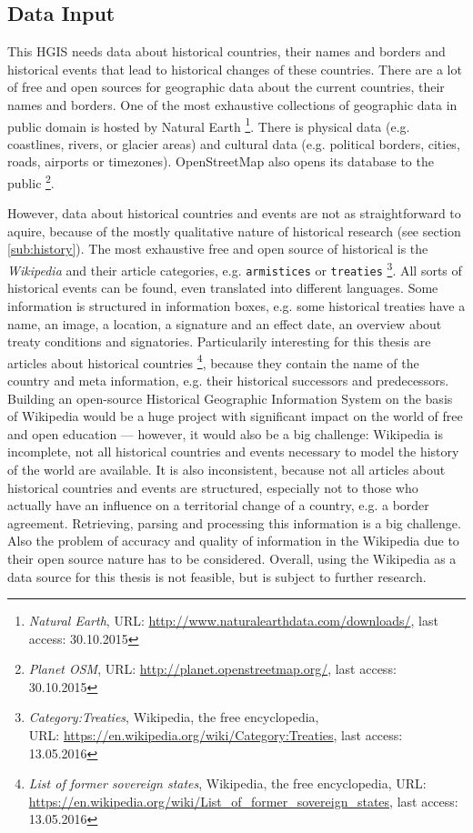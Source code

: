 \subsection{Data Input} %
\label{sub:input}

This HGIS needs data about historical countries, their names and borders and historical events that lead to historical changes of these countries. There are a lot of free and open sources for geographic data about the current countries, their names and borders. One of the most exhaustive collections of geographic data in public domain is hosted by Natural Earth
\footnote{
  \textit{Natural Earth},
  URL: \url{http://www.naturalearthdata.com/downloads/},
  last access: 30.10.2015
}.
There is physical data (e.g. coastlines, rivers, or glacier areas) and cultural data (e.g. political borders, cities, roads, airports or timezones). OpenStreetMap also opens its database to the public
\footnote{
  \textit{Planet OSM},
  URL: \url{http://planet.openstreetmap.org/},
  last access: 30.10.2015
}.

However, data about historical countries and events are not as straightforward to aquire, because of the mostly qualitative nature of historical research (see section \ref{sub:history}). The most exhaustive free and open source of historical is the \emph{Wikipedia} and their article categories, e.g. \texttt{armistices} or \texttt{treaties}
\footnote{
  \textit{Category:Treaties},
  Wikipedia, the free encyclopedia,\\
  URL: \url{https://en.wikipedia.org/wiki/Category:Treaties},
  last access: 13.05.2016
}.
All sorts of historical events can be found, even translated into different languages. Some information is structured in information boxes, e.g. some historical treaties have a name, an image, a location, a signature and an effect date, an overview about treaty conditions and signatories. Particularily interesting for this thesis are articles about historical countries
\footnote{
  \textit{List of former sovereign states},
  Wikipedia, the free encyclopedia,
  URL: \url{https://en.wikipedia.org/wiki/List_of_former_sovereign_states},
  last access: 13.05.2016
},
because they contain the name of the country and meta information, e.g. their historical successors and predecessors. Building an open-source Historical Geographic Information System on the basis of Wikipedia would be a huge project with significant impact on the world of free and open education --- however, it would also be a big challenge: Wikipedia is incomplete, not all historical countries and events necessary to model the history of the world are available. It is also inconsistent, because not all articles about historical countries and events are structured, especially not to those who actually have an influence on a territorial change of a country, e.g. a border agreement. Retrieving, parsing and processing this information is a big challenge. Also the problem of accuracy and quality of information in the Wikipedia due to their open source nature has to be considered. Overall, using the Wikipedia as a data source for this thesis is not feasible, but is subject to further research.

